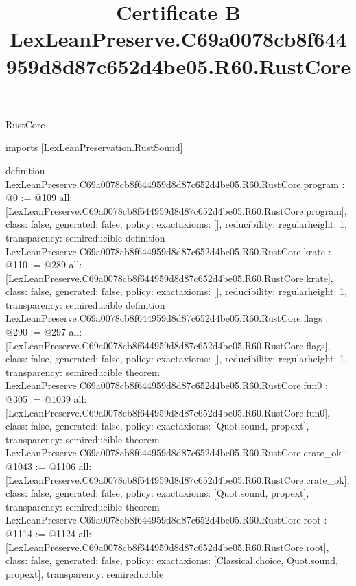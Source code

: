\begin{lexlean}{RustCore}
\title{Certificate B LexLeanPreserve.C69a0078cb8f644959d8d87c652d4be05.R60.RustCore}
\begin{coremodule}
imports [LexLeanPreservation.RustSound]

definition LexLeanPreserve.C69a0078cb8f644959d8d87c652d4be05.R60.RustCore.program : @0 := @109 {
  all: [LexLeanPreserve.C69a0078cb8f644959d8d87c652d4be05.R60.RustCore.program],
  class: false,
  generated: false,
  policy: exact{axioms: []},
  reducibility: regular{height: 1},
  transparency: semireducible
}
definition LexLeanPreserve.C69a0078cb8f644959d8d87c652d4be05.R60.RustCore.krate : @110 := @289 {
  all: [LexLeanPreserve.C69a0078cb8f644959d8d87c652d4be05.R60.RustCore.krate],
  class: false,
  generated: false,
  policy: exact{axioms: []},
  reducibility: regular{height: 1},
  transparency: semireducible
}
definition LexLeanPreserve.C69a0078cb8f644959d8d87c652d4be05.R60.RustCore.flags : @290 := @297 {
  all: [LexLeanPreserve.C69a0078cb8f644959d8d87c652d4be05.R60.RustCore.flags],
  class: false,
  generated: false,
  policy: exact{axioms: []},
  reducibility: regular{height: 1},
  transparency: semireducible
}
theorem LexLeanPreserve.C69a0078cb8f644959d8d87c652d4be05.R60.RustCore.fun0 : @305 := @1039 {
  all: [LexLeanPreserve.C69a0078cb8f644959d8d87c652d4be05.R60.RustCore.fun0],
  class: false,
  generated: false,
  policy: exact{axioms: [Quot.sound, propext]},
  transparency: semireducible
}
theorem LexLeanPreserve.C69a0078cb8f644959d8d87c652d4be05.R60.RustCore.crate_ok : @1043 := @1106 {
  all: [LexLeanPreserve.C69a0078cb8f644959d8d87c652d4be05.R60.RustCore.crate_ok],
  class: false,
  generated: false,
  policy: exact{axioms: [Quot.sound, propext]},
  transparency: semireducible
}
theorem LexLeanPreserve.C69a0078cb8f644959d8d87c652d4be05.R60.RustCore.root : @1114 := @1124 {
  all: [LexLeanPreserve.C69a0078cb8f644959d8d87c652d4be05.R60.RustCore.root],
  class: false,
  generated: false,
  policy: exact{axioms: [Classical.choice, Quot.sound, propext]},
  transparency: semireducible
}


\end{coremodule}
\end{lexlean}
